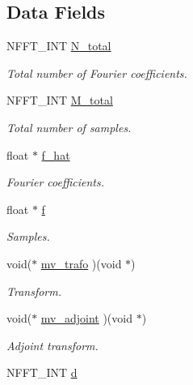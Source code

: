 \subsection*{Data Fields}
\begin{DoxyCompactItemize}
\item 
N\-F\-F\-T\-\_\-\-I\-N\-T \hyperlink{structnfstf__plan_a70b5a94f522655bf7b0a5416dfaf99ec}{N\-\_\-total}
\begin{DoxyCompactList}\small\item\em Total number of Fourier coefficients. \end{DoxyCompactList}\item 
N\-F\-F\-T\-\_\-\-I\-N\-T \hyperlink{structnfstf__plan_ab20327e7b5d79f69602853caf0988423}{M\-\_\-total}
\begin{DoxyCompactList}\small\item\em Total number of samples. \end{DoxyCompactList}\item 
float $\ast$ \hyperlink{structnfstf__plan_ab57019bf0a7274b5a6f401fe2f6bcf2b}{f\-\_\-hat}
\begin{DoxyCompactList}\small\item\em Fourier coefficients. \end{DoxyCompactList}\item 
float $\ast$ \hyperlink{structnfstf__plan_a178dae9cc4b5869ef69fd148efe14f93}{f}
\begin{DoxyCompactList}\small\item\em Samples. \end{DoxyCompactList}\item 
void($\ast$ \hyperlink{structnfstf__plan_aa960f82c35501acf5237b5ed49f7fe57}{mv\-\_\-trafo} )(void $\ast$)
\begin{DoxyCompactList}\small\item\em Transform. \end{DoxyCompactList}\item 
void($\ast$ \hyperlink{structnfstf__plan_a604a83ef64c291c6f8b23d45f620f2c7}{mv\-\_\-adjoint} )(void $\ast$)
\begin{DoxyCompactList}\small\item\em Adjoint transform. \end{DoxyCompactList}\item 
\hypertarget{structnfstf__plan_aa06be832129735348e355c82f7cee26c}{N\-F\-F\-T\-\_\-\-I\-N\-T \hyperlink{structnfstf__plan_aa06be832129735348e355c82f7cee26c}{d}}\label{structnfstf__plan_aa06be832129735348e355c82f7cee26c}


\end{DoxyCompactItemize}
